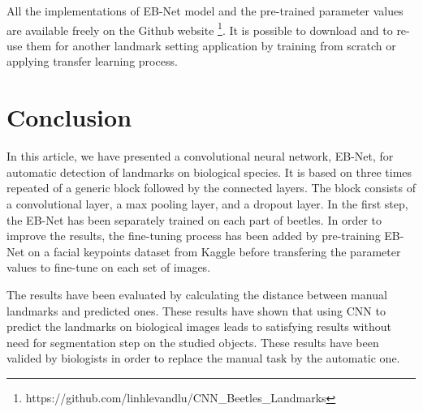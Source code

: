 \documentclass[review]{elsarticle}
\begin{document}
All the implementations of EB-Net model and the pre-trained parameter values are available freely on the Github website \footnote{https://github.com/linhlevandlu/CNN\_Beetles\_Landmarks}. It is possible to download and to re-use them for another landmark setting application by training from scratch or applying transfer learning process.


\section{Conclusion}
In this article, we have presented a convolutional neural network, EB-Net, for automatic detection of landmarks on biological species. It is based on three times repeated of a generic block followed by the connected layers. The block consists of a convolutional layer, a max pooling layer, and a dropout layer. In the first step, the EB-Net has been separately trained on each part of beetles. In order to improve the results, the fine-tuning process has been added by pre-training EB-Net on a facial keypoints dataset from Kaggle before transfering the parameter values to fine-tune on each set of images.

The results have been evaluated by calculating the distance between manual landmarks and predicted ones. These results have shown that using CNN to predict the landmarks on biological images leads to satisfying results without need for segmentation step on the studied objects. These results have been valided by biologists in order to replace the manual task by the automatic one.
\end{document}
